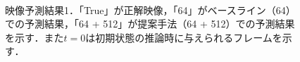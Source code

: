 \documentclass[10pt, twocolumn]{jarticle}
\begin{document}


\begin{figure}[tp]
    \centering
    \\
    \caption[映像予測結果1]{\small 映像予測結果1．「True」が正解映像，「64」がベースライン（64）での予測結果，「64 + 512」が提案手法（64 + 512）での予測結果を示す．また$t = 0$は初期状態の推論時に与えられるフレームを示す．}
    \label{fig:compare_ad}
\end{figure}
\end{document}

